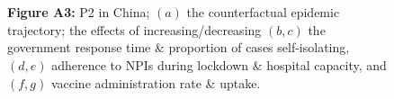 \documentclass[paper=a4,fontsize=11pt]{article}
\begin{document}
\begin{figure}[!h]
  \\
  \hspace{1.76cm}
  \\
  \caption*{\textbf{Figure A3:} P2 in China; $(a)$ the counterfactual epidemic trajectory; the effects of increasing/decreasing $(b,c)$ the government response time \& proportion of cases self-isolating, $(d,e)$ adherence to NPIs during lockdown \& hospital capacity, and $(f,g)$ vaccine administration rate \& uptake.}
\end{figure}
\end{document}
